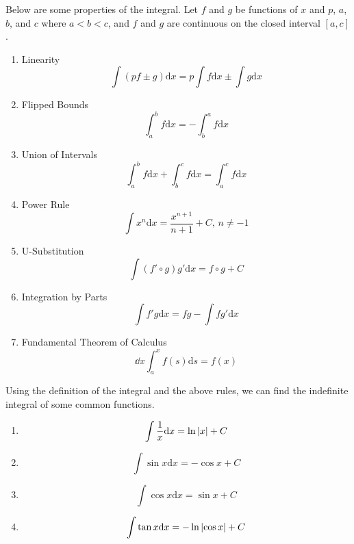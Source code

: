 \noindent
Below are some properties of the integral. Let $f$ and $g$ be functions of $x$ and $p$, $a$, $b$, and $c$ where $a < b < c$, and $f$ and $g$ are continuous on the closed interval $[a,c]$.
\begin{enumerate}[label=]
	\item Linearity
	\begin{equation*}
		\int{(pf \pm g) \mathrm{d}x} = p\int{f \mathrm{d}x} \pm \int{g \mathrm{d}x}
	\end{equation*}
	\item Flipped Bounds
	\begin{equation*}
		\int_{a}^{b}{f \mathrm{d}x} = -\int_{b}^{a}{f \mathrm{d}x}
	\end{equation*}
	\item Union of Intervals
	\begin{equation*}
		\int_{a}^{b}{f \mathrm{d}x} + \int_{b}^{c}{f \mathrm{d}x} = \int_{a}^{c}{f \mathrm{d}x}
	\end{equation*}
	\item Power Rule
	\begin{equation*}
		\int{x^n \mathrm{d}x} = \frac{x^{n+1}}{n+1} + C \text{, }n \neq -1
	\end{equation*}
	\item U-Substitution
	\begin{equation*}
		\int{\left(f'\circ g\right) g' \mathrm{d}x} = f\circ g+ C
	\end{equation*}
	\item Integration by Parts
	\begin{equation*}
		\int{f' g \mathrm{d}x} = fg - \int{fg' \mathrm{d}x}
	\end{equation*}
	\item Fundamental Theorem of Calculus
	\begin{equation*}
		\dd{}{x}\int_{a}^{x}{f(s) \mathrm{d}s} = f(x)
	\end{equation*}
\end{enumerate}
Using the definition of the integral and the above rules, we can find the indefinite integral of some common functions.
\begin{enumerate}[label=]
	\item 
	\begin{equation*}
	\int{\frac{1}{x} \mathrm{d}x} = \ln{\lvert x \rvert} + C
	\end{equation*}
	\item 
	\begin{equation*}
	\int{\sin{x} \mathrm{d}x} = -\cos{x} + C
	\end{equation*}
	\item 
	\begin{equation*}
	\int{\cos{x} \mathrm{d}x} = \sin{x} + C
	\end{equation*}
	\item 
	\begin{equation*}
	\int{\tan{x} \mathrm{d}x} = -\ln{\lvert \cos{x} \rvert} + C
	\end{equation*}
\end{enumerate}
